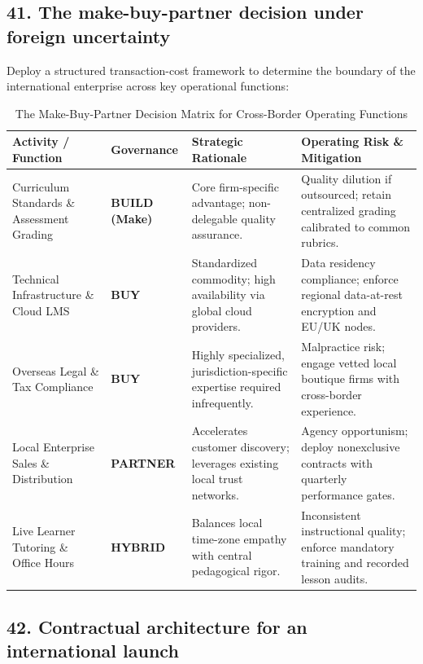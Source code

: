 \subsection{41. The make-buy-partner decision under foreign uncertainty}

Deploy a structured transaction-cost framework to determine the boundary of the international enterprise across key operational functions:

\begin{table}[t]
\centering
\small
\caption{The Make-Buy-Partner Decision Matrix for Cross-Border Operating Functions}
\label{tab:make_buy_partner}
\begin{tabularx}{\textwidth}{p{2.8cm} p{2.2cm} p{3.6cm} X}
\toprule
\textbf{Activity / Function} & \textbf{Governance} & \textbf{Strategic Rationale} & \textbf{Operating Risk \& Mitigation} \\
\midrule
Curriculum Standards \& Assessment Grading & \textbf{BUILD (Make)} & Core firm-specific advantage; non-delegable quality assurance. & Quality dilution if outsourced; retain centralized grading calibrated to common rubrics. \\
Technical Infrastructure \& Cloud LMS & \textbf{BUY} & Standardized commodity; high availability via global cloud providers. & Data residency compliance; enforce regional data-at-rest encryption and EU/UK nodes. \\
Overseas Legal \& Tax Compliance & \textbf{BUY} & Highly specialized, jurisdiction-specific expertise required infrequently. & Malpractice risk; engage vetted local boutique firms with cross-border experience. \\
Local Enterprise Sales \& Distribution & \textbf{PARTNER} & Accelerates customer discovery; leverages existing local trust networks. & Agency opportunism; deploy nonexclusive contracts with quarterly performance gates. \\
Live Learner Tutoring \& Office Hours & \textbf{HYBRID} & Balances local time-zone empathy with central pedagogical rigor. & Inconsistent instructional quality; enforce mandatory training and recorded lesson audits. \\
\bottomrule
\end{tabularx}
\end{table}

\subsection{42. Contractual architecture for an international launch}

